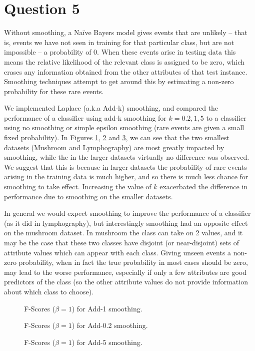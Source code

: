 \documentclass[11pt]{article}
\begin{document}
    \pagebreak
    \section*{Question 5}
    Without smoothing, a Na\"{i}ve Bayers model gives events that are unlikely -- that is, events we have not seen in training for that particular class, but are not impossible -- a probability of 0. When these events arise in testing data this means the relative likelihood of the relevant class is assigned to be zero, which erases any information obtained from the other attributes of that test instance. Smoothing techniques attempt to get around this by estimating a non-zero probability for these rare events. 

    We implemented Laplace (a.k.a Add-k) smoothing, and compared the performance of a classifier using add-k smoothing for $k = 0.2, 1, 5$ to a classifier using no smoothing or simple epsilon smoothing (rare events are given a small fixed probability). In Figures \ref{fig:q5-add-1}, \ref{fig:q5-add-0.2} and \ref{fig:q5-add-5}, we can see that the two smallest datasets (Mushroom and Lymphography) are most greatly impacted by smoothing, while the in the larger datasets virtually no difference was observed. We suggest that this is because in larger datasets the probability  of rare events arising in the training data is much higher, and so there is much less chance for smoothing to take effect.
    Increasing the value of $k$ exacerbated the difference in performance due to smoothing on the smaller datasets.
    
    In general we would expect smoothing to improve the performance of a classifier (as it did in lymphography), but interestingly smoothing had an opposite effect on the mushroom dataset. In mushroom the class can take on 2 values, and it may be the case that these two classes have disjoint (or near-disjoint) sets of attribute values which can appear with each class. Giving unseen events a non-zero probability, when in fact the true probability in most cases should be zero, may lead to the worse performance, especially if only a few attributes are good predictors of the class (so the other attribute values do not provide information about which class to choose).
    \begin{figure}[H]
        \centering
        \def\svgwidth{\columnwidth}
        \fbox{\scalebox{0.8}{}}
        \caption{F-Scores ($\beta = 1$) for Add-1 smoothing.}
        \label{fig:q5-add-1}
    \end{figure}
    \begin{figure}[H]
        \centering
        \def\svgwidth{\columnwidth}
        \fbox{\scalebox{0.8}{}}
        \caption{F-Scores ($\beta = 1$) for Add-0.2 smoothing.}
        \label{fig:q5-add-0.2}
    \end{figure}
    \begin{figure}[H]
        \centering
        \def\svgwidth{\columnwidth}
        \fbox{\scalebox{0.8}{}}
        \caption{F-Scores ($\beta = 1$) for Add-5 smoothing.}
        \label{fig:q5-add-5}
    \end{figure}
\end{document}
